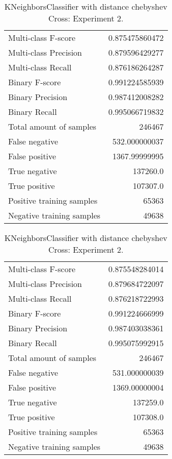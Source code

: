 \begin{table}[H]
\begin{minipage}{0.5\textwidth}
\caption{KNeighborsClassifier with distance chebyshev Cross: Experiment 1.}
\centering
\begin{tabular}{l r}
\toprule
Multi-class F-score & 0.875475860472 \\
Multi-class Precision & 0.879596429277 \\
Multi-class Recall & 0.876186264287 \\
\midrule
Binary F-score & 0.991224585939 \\
Binary Precision & 0.987412008282 \\
Binary Recall & 0.995066719832 \\
\midrule
Total amount of samples & 246467 \\
False negative & 532.000000037 \\
False positive & 1367.99999995 \\
True negative & 137260.0 \\
True positive & 107307.0 \\
\midrule
Positive training samples & 65363 \\
Negative training samples & 49638 \\
\bottomrule
\end{tabular}
\end{minipage}
\hfillx
\begin{minipage}{0.5\textwidth}
\caption{KNeighborsClassifier with distance chebyshev Cross: Experiment 2.}
\centering
\begin{tabular}{l r}
\toprule
Multi-class F-score & 0.875548284014 \\
Multi-class Precision & 0.879684722097 \\
Multi-class Recall & 0.876218722993 \\
\midrule
Binary F-score & 0.991224666999 \\
Binary Precision & 0.987403038361 \\
Binary Recall & 0.995075992915 \\
\midrule
Total amount of samples & 246467 \\
False negative & 531.000000039 \\
False positive & 1369.00000004 \\
True negative & 137259.0 \\
True positive & 107308.0 \\
\midrule
Positive training samples & 65363 \\
Negative training samples & 49638 \\
\bottomrule
\end{tabular}
\end{minipage}
\end{table}
